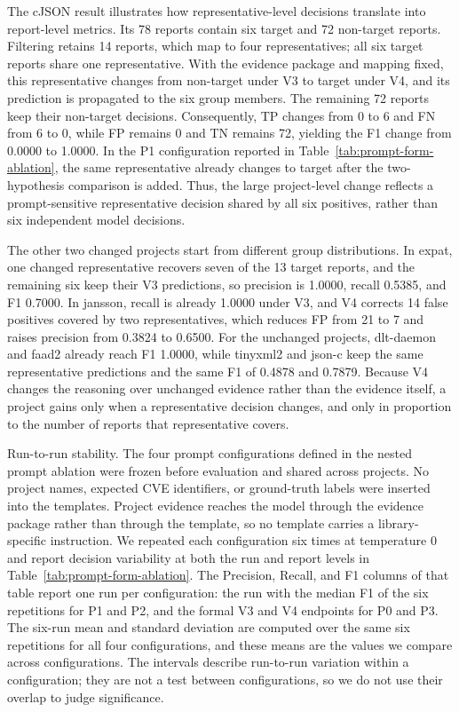 \documentclass[pdflatex,sn-basic]{sn-jnl}%
\theoremstyle{thmstyleone}%
\theoremstyle{thmstyletwo}%
\theoremstyle{thmstylethree}%
\begin{document}
{\color{blue}
The cJSON result illustrates how representative-level decisions translate into report-level metrics. Its 78 reports contain six target and 72 non-target reports. Filtering retains 14 reports, which map to four representatives; all six target reports share one representative. With the evidence package and mapping fixed, this representative changes from non-target under V3 to target under V4, and its prediction is propagated to the six group members. The remaining 72 reports keep their non-target decisions. Consequently, TP changes from 0 to 6 and FN from 6 to 0, while FP remains 0 and TN remains 72, yielding the F1 change from 0.0000 to 1.0000. In the P1 configuration reported in Table~\ref{tab:prompt-form-ablation}, the same representative already changes to target after the two-hypothesis comparison is added. Thus, the large project-level change reflects a prompt-sensitive representative decision shared by all six positives, rather than six independent model decisions.
}

{\color{blue}
The other two changed projects start from different group distributions. In expat, one changed representative recovers seven of the 13 target reports, and the remaining six keep their V3 predictions, so precision is 1.0000, recall 0.5385, and F1 0.7000. In jansson, recall is already 1.0000 under V3, and V4 corrects 14 false positives covered by two representatives, which reduces FP from 21 to 7 and raises precision from 0.3824 to 0.6500. For the unchanged projects, dlt-daemon and faad2 already reach F1 1.0000, while tinyxml2 and json-c keep the same representative predictions and the same F1 of 0.4878 and 0.7879. Because V4 changes the reasoning over unchanged evidence rather than the evidence itself, a project gains only when a representative decision changes, and only in proportion to the number of reports that representative covers.
}

{\color{blue}
Run-to-run stability. The four prompt configurations defined in the nested prompt ablation were frozen before evaluation and shared across projects. No project names, expected CVE identifiers, or ground-truth labels were inserted into the templates. Project evidence reaches the model through the evidence package rather than through the template, so no template carries a library-specific instruction. We repeated each configuration six times at temperature 0 and report decision variability at both the run and report levels in Table~\ref{tab:prompt-form-ablation}. The Precision, Recall, and F1 columns of that table report one run per configuration: the run with the median F1 of the six repetitions for P1 and P2, and the formal V3 and V4 endpoints for P0 and P3. The six-run mean and standard deviation are computed over the same six repetitions for all four configurations, and these means are the values we compare across configurations. The intervals describe run-to-run variation within a configuration; they are not a test between configurations, so we do not use their overlap to judge significance.
}
\end{document}
